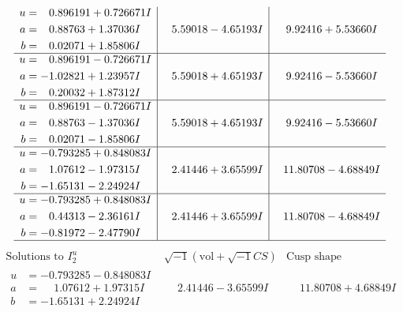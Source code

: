 \documentclass[1p]{elsarticle_modified}
\theoremstyle{definition}
\newcommand{\I}{\sqrt{-1}}
\begin{document}
$$\begin{array}{c|c|c}
\begin{aligned}
u &= \phantom{-}0.896191 + 0.726671 I \\
a &= \phantom{-}0.88763 + 1.37036 I \\
b &= \phantom{-}0.02071 + 1.85806 I\end{aligned}
 & \phantom{-}5.59018 - 4.65193 I & \phantom{-}9.92416 + 5.53660 I \\ \hline\begin{aligned}
u &= \phantom{-}0.896191 - 0.726671 I \\
a &= -1.02821 + 1.23957 I \\
b &= \phantom{-}0.20032 + 1.87312 I\end{aligned}
 & \phantom{-}5.59018 + 4.65193 I & \phantom{-}9.92416 - 5.53660 I \\ \hline\begin{aligned}
u &= \phantom{-}0.896191 - 0.726671 I \\
a &= \phantom{-}0.88763 - 1.37036 I \\
b &= \phantom{-}0.02071 - 1.85806 I\end{aligned}
 & \phantom{-}5.59018 + 4.65193 I & \phantom{-}9.92416 - 5.53660 I \\ \hline\begin{aligned}
u &= -0.793285 + 0.848083 I \\
a &= \phantom{-}1.07612 - 1.97315 I \\
b &= -1.65131 - 2.24924 I\end{aligned}
 & \phantom{-}2.41446 + 3.65599 I & \phantom{-}11.80708 - 4.68849 I \\ \hline\begin{aligned}
u &= -0.793285 + 0.848083 I \\
a &= \phantom{-}0.44313 - 2.36161 I \\
b &= -0.81972 - 2.47790 I\end{aligned}
 & \phantom{-}2.41446 + 3.65599 I & \phantom{-}11.80708 - 4.68849 I\\
 \hline 
 \end{array}$$\newpage$$\begin{array}{c|c|c}  
\text{Solutions to }I^u_{2}& \I (\text{vol} + \sqrt{-1}CS) & \text{Cusp shape}\\
 \hline 
\begin{aligned}
u &= -0.793285 - 0.848083 I \\
a &= \phantom{-}1.07612 + 1.97315 I \\
b &= -1.65131 + 2.24924 I\end{aligned}
 & \phantom{-}2.41446 - 3.65599 I & \phantom{-}11.80708 + 4.68849 I \\ \hline\begin{aligned}

\end{aligned}
\end{array}$$
\end{document}
